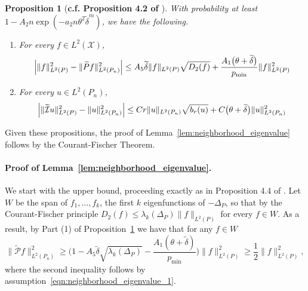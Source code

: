 \documentclass{article}
\newcommand{\1}{\mathbf{1}}
\newcommand{\Xset}{\mathcal{X}}
\newcommand{\Leb}{L}
\newcommand{\mc}[1]{\mathcal{#1}}
\newcommand{\wt}[1]{\widetilde{#1}}
\theoremstyle{alden}
\theoremstyle{aldenthm}
\newtheorem{proposition}{Proposition}
\theoremstyle{definition}
\theoremstyle{remark}
\begin{document}
\begin{proposition}[\textbf{c.f. Proposition 4.2 of \citet{calder2019}}]
	\label{prop:isometry}
	With probability at least $1 - A_2n\exp(-a_2n\theta^2\wt{\delta}^{m})$, we have the following.
	\begin{enumerate}[(1)]
		\item For every $f \in \Leb^2(\Xset)$,
		\begin{equation*}
		\Bigl|\|f\|_{\Leb^2(P)}^2 - \|\wt{P}f\|_{\Leb^2(P_n)}^2\Bigr| \leq A_5 \wt{\delta} \|f\|_{\Leb^2(P)} \sqrt{D_2(f)} + \frac{A_1\bigl(\theta + \wt{\delta}\bigr)}{p_{\min}} \|f\|_{\Leb^2(P)}^2
		\end{equation*}
		\item For every $u \in \Leb^2(P_n)$,
		\begin{equation*}
		\Bigl|\|\wt{\mc{I}}u\|_{\Leb^2(P)}^2 - \|u\|_{\Leb^2(P_n)}^2\Bigr| \leq C r \|u\|_{\Leb^2(P_n)} \sqrt{b_r(u)} + C\bigl(\theta + \wt{\delta}\bigr) \|u\|_{\Leb^2(P_n)}^2
		\end{equation*}
	\end{enumerate}
\end{proposition}

Given these propositions, the proof of Lemma~\ref{lem:neighborhood_eigenvalue} follows by the Courant-Fischer Theorem.

\paragraph{Proof of Lemma~\ref{lem:neighborhood_eigenvalue}.}
We start with the upper bound, proceeding exactly as in Proposition 4.4 of \citep{burago2014}. Let $W$ be the span of $f_1,\ldots,f_{k}$, the first $k$ eigenfunctions of $-\Delta_P$, so that by the Courant-Fischer principle $D_2(f) \leq \lambda_k(\Delta_P) \|f\|_{\Leb^2(P)}$ for every $f \in W$. As a result, by Part (1) of Proposition~\ref{prop:isometry} we have that for any $f \in W$
\begin{equation*}
\bigl\|\wt{\mc{P}}f\bigr\|_{\Leb^2(P_n)}^2 \geq \biggl(1 - A_5\wt{\delta} \sqrt{\lambda_{k}(\Delta_P)} - \frac{A_1(\theta + \wt{\delta})}{p_{\min}}\biggr)\|f\|_{\Leb^2(P)}^2  \geq \frac{1}{2} \|f\|_{\Leb^2(P)}^2,
\end{equation*}
where the second inequality follows by assumption~\eqref{eqn:neighborhood_eigenvalue_1}.
\end{document}
